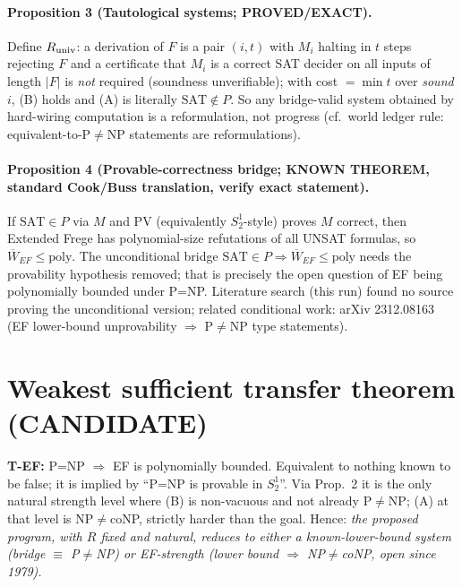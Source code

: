 \documentclass{article}\usepackage{amsmath,amssymb,amsthm}
\begin{document}
\paragraph{Proposition 3 (Tautological systems; PROVED/EXACT).} Define $R_{\rm univ}$: a derivation of $F$ is a pair $(i,t)$ with $M_i$ halting in $t$ steps rejecting $F$ and a certificate that $M_i$ is a correct SAT decider on all inputs of length $|F|$ is \emph{not} required (soundness unverifiable); with cost $=\min t$ over \emph{sound} $i$, (B) holds and (A) is literally $\mathrm{SAT}\notin P$. So any bridge-valid system obtained by hard-wiring computation is a reformulation, not progress (cf.\ world ledger rule: equivalent-to-P$\ne$NP statements are reformulations).

\paragraph{Proposition 4 (Provable-correctness bridge; KNOWN THEOREM, standard Cook/Buss translation, verify exact statement).} If $\mathrm{SAT}\in P$ via $M$ and PV (equivalently $S^1_2$-style) proves $M$ correct, then Extended Frege has polynomial-size refutations of all UNSAT formulas, so $\overline W_{EF}\le\mathrm{poly}$. The unconditional bridge $\mathrm{SAT}\in P\Rightarrow\overline W_{EF}\le\mathrm{poly}$ needs the provability hypothesis removed; that is precisely the open question of EF being polynomially bounded under P=NP. Literature search (this run) found no source proving the unconditional version; related conditional work: arXiv 2312.08163 (EF lower-bound unprovability $\Rightarrow$ P$\neq$NP type statements).

\section*{Weakest sufficient transfer theorem (CANDIDATE)}
\textbf{T-EF:} P=NP $\Rightarrow$ EF is polynomially bounded. Equivalent to nothing known to be false; it is implied by ``P=NP is provable in $S^1_2$''. Via Prop.~2 it is the only natural strength level where (B) is non-vacuous and not already P$\ne$NP; (A) at that level is NP$\ne$coNP, strictly harder than the goal. Hence: \emph{the proposed program, with $R$ fixed and natural, reduces to either a known-lower-bound system (bridge $\equiv$ P$\ne$NP) or EF-strength (lower bound $\Rightarrow$ NP$\ne$coNP, open since 1979).}
\end{document}
